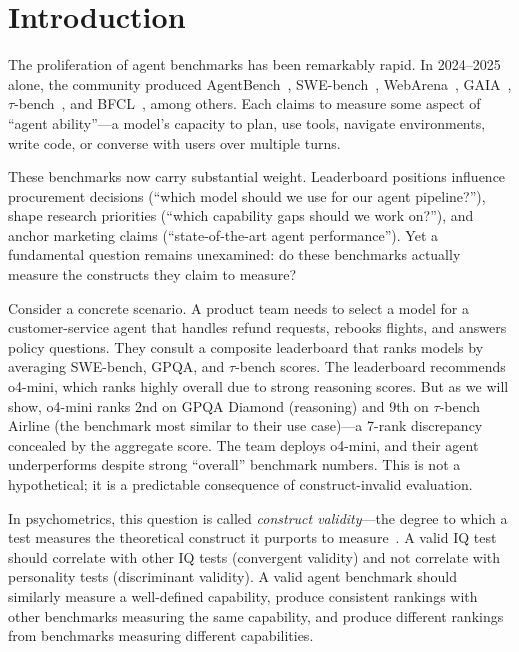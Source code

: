 \documentclass[sigconf]{acmart}
\begin{document}



\maketitle

\section{Introduction}
The proliferation of agent benchmarks has been remarkably rapid. In 2024--2025 alone, the community produced AgentBench~\cite{liu2024agentbench}, SWE-bench~\cite{jimenez2024swebench}, WebArena~\cite{zhou2024webarena}, GAIA~\cite{mialon2024gaia}, $\tau$-bench~\cite{yao2024taubench}, and BFCL~\cite{patil2025bfcl}, among others. Each claims to measure some aspect of ``agent ability''---a model's capacity to plan, use tools, navigate environments, write code, or converse with users over multiple turns.

These benchmarks now carry substantial weight. Leaderboard positions influence procurement decisions (``which model should we use for our agent pipeline?''), shape research priorities (``which capability gaps should we work on?''), and anchor marketing claims (``state-of-the-art agent performance''). Yet a fundamental question remains unexamined: do these benchmarks actually measure the constructs they claim to measure?

Consider a concrete scenario. A product team needs to select a model for a customer-service agent that handles refund requests, rebooks flights, and answers policy questions. They consult a composite leaderboard that ranks models by averaging SWE-bench, GPQA, and $\tau$-bench scores. The leaderboard recommends o4-mini, which ranks highly overall due to strong reasoning scores. But as we will show, o4-mini ranks 2nd on GPQA Diamond (reasoning) and 9th on $\tau$-bench Airline (the benchmark most similar to their use case)---a 7-rank discrepancy concealed by the aggregate score. The team deploys o4-mini, and their agent underperforms despite strong ``overall'' benchmark numbers. This is not a hypothetical; it is a predictable consequence of construct-invalid evaluation.

In psychometrics, this question is called \emph{construct validity}---the degree to which a test measures the theoretical construct it purports to measure~\cite{cronbach1955construct}. A valid IQ test should correlate with other IQ tests (convergent validity) and not correlate with personality tests (discriminant validity). A valid agent benchmark should similarly measure a well-defined capability, produce consistent rankings with other benchmarks measuring the same capability, and produce different rankings from benchmarks measuring different capabilities.
\end{document}
